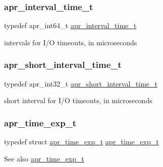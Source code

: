 \subsubsection{\texorpdfstring{apr\+\_\+interval\+\_\+time\+\_\+t}{apr\_interval\_time\_t}}
{\footnotesize\ttfamily typedef apr\+\_\+int64\+\_\+t \mbox{\hyperlink{group__apr__time_gaae2129185a395cc393f76fabf4f43e47}{apr\+\_\+interval\+\_\+time\+\_\+t}}}

intervals for I/O timeouts, in microseconds \mbox{\label{group__apr__time_ga3e4663cc0d8b730902ff697c8d3f64be}} 
\subsubsection{\texorpdfstring{apr\+\_\+short\+\_\+interval\+\_\+time\+\_\+t}{apr\_short\_interval\_time\_t}}
{\footnotesize\ttfamily typedef apr\+\_\+int32\+\_\+t \mbox{\hyperlink{group__apr__time_ga3e4663cc0d8b730902ff697c8d3f64be}{apr\+\_\+short\+\_\+interval\+\_\+time\+\_\+t}}}

short interval for I/O timeouts, in microseconds \mbox{\label{group__apr__time_gae28f2767111a534f263ced95a28489b1}} 
\subsubsection{\texorpdfstring{apr\+\_\+time\+\_\+exp\+\_\+t}{apr\_time\_exp\_t}}
{\footnotesize\ttfamily typedef struct \mbox{\hyperlink{structapr__time__exp__t}{apr\+\_\+time\+\_\+exp\+\_\+t}} \mbox{\hyperlink{structapr__time__exp__t}{apr\+\_\+time\+\_\+exp\+\_\+t}}}

\begin{DoxySeeAlso}{See also}
\mbox{\hyperlink{structapr__time__exp__t}{apr\+\_\+time\+\_\+exp\+\_\+t}} 
\end{DoxySeeAlso}
\mbox{\label{group__apr__time_gadb4bde16055748190eae190c55aa02bb}} 
